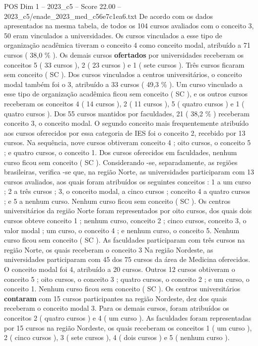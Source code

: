 \begin{textsample}{POS Dim 1 – 2023\_c5 – Score 22.00 – 2023\_c5/enade\_2023\_med\_c56e7c1ea6.txt}
De acordo com os dados apresentados na mesma tabela, de todos os 104 cursos avaliados com o conceito 3, 50 eram vinculados a universidades.
Os cursos vinculados a esse tipo de organização acadêmica tiveram o conceito 4 como conceito modal, atribuído a 71 cursos ( 38,0 \% ).
Os demais cursos \textbf{ofertados} por universidades receberam os conceitos 5 ( 33 cursos ), 2 ( 23 cursos ) e 1 ( sete cursos ).
Três cursos ficaram sem conceito ( SC ).
Dos cursos vinculados a centros universitários, o conceito modal também foi o 3, atribuído a 33 cursos ( 49,3 \% ).
Um curso vinculado a esse tipo de organização acadêmica ficou sem conceito ( SC ), e os outros cursos receberam os conceitos 4 ( 14 cursos ), 2 ( 11 cursos ), 5 ( quatro cursos ) e 1 ( quatro cursos ).
Dos 55 cursos mantidos por faculdades, 21 ( 38,2 \% ) receberam conceito 3, o conceito modal.
O segundo conceito mais frequentemente atribuído aos cursos oferecidos por essa categoria de IES foi o conceito 2, recebido por 13 cursos.
Na sequência, nove cursos obtiveram conceito 4 ; oito cursos, o conceito 5 ; e quatro cursos, o conceito 1.
Dos cursos oferecidos em faculdades, nenhum curso ficou sem conceito ( SC ).
Considerando -se, separadamente, as regiões brasileiras, verifica -se que, na região Norte, as universidades participaram com 13 cursos avaliados, aos quais foram atribuídos os seguintes conceitos : 1 a um curso ; 2 a três cursos ; 3, o conceito modal, a cinco cursos ; conceito 4 a quatro cursos ; e 5 a nenhum curso.
Nenhum curso ficou sem conceito ( SC ).
Os centros universitários da região Norte foram representados por oito cursos, dos quais dois cursos obteve conceito 1 ; nenhum curso, conceito 2 ; cinco cursos, conceito 3, o valor modal ; um curso, o conceito 4 ; e nenhum curso, o conceito 5.
Nenhum curso ficou sem conceito ( SC ).
As faculdades participaram com três cursos na região Norte, os quais receberam o conceito 3 Na região Nordeste, as universidades participaram com 45 dos 75 cursos da área de Medicina oferecidos.
O conceito modal foi 4, atribuído a 20 cursos.
Outros 12 cursos obtiveram o conceito 5 ; oito cursos, o conceito 3 ; quatro cursos, o conceito 2 ; e um curso, o conceito 1.
Nenhum curso ficou sem conceito ( SC ).
Os centros universitários \textbf{contaram} com 15 cursos participantes na região Nordeste, dez dos quais receberam o conceito modal 3.
Para os demais cursos, foram atribuídos os conceitos 2 ( quatro cursos ) e 4 ( um curso ).
As faculdades foram representadas por 15 cursos na região Nordeste, os quais receberam os conceitos 1 ( um curso ), 2 ( cinco cursos ), 3 ( sete cursos ), 4 ( dois cursos ) e 5 ( nenhum curso ).

\end{textsample}
